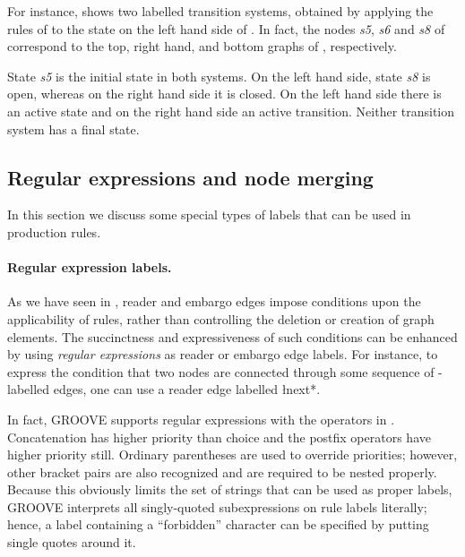 For instance,  shows two labelled transition systems, obtained by
applying the rules of  to the state on the left hand
side of . In fact, the nodes \emph{s5}, \emph{s6} and \emph{s8}
of  correspond to the top, right hand, and bottom graphs of
, respectively.

State \emph{s5} is the initial state in both systems. On the left hand side,
state \emph{s8} is open, whereas on the right hand side it is closed.  On the
left hand side there is an active state and on the right hand side an active
transition. Neither transition system has a final state.

\subsection{Regular expressions and node merging}

In this section we discuss some special types of labels that can be used in
production rules.

\paragraph{Regular expression labels.}

As we have seen in , reader and embargo edges impose
conditions upon the applicability of rules, rather than controlling the
deletion or creation of graph elements. The succinctness and expressiveness of
such conditions can be enhanced by using \emph{regular expressions} as reader
or embargo edge labels. For instance, to express the condition that two nodes
are connected through some sequence of \nextL-labelled edges, one can use a
reader edge labelled \l{next*}.

In fact, GROOVE supports regular expressions with the operators in
. Concatenation has higher priority than choice and the postfix
operators have higher priority still. Ordinary parentheses are used to override
priorities; however, other bracket pairs are also recognized and are required
to be nested properly. Because this obviously limits the set of strings that
can be used as proper labels, GROOVE interprets all singly-quoted subexpressions on
rule labels literally; hence, a label containing a ``forbidden'' character can
be specified by putting single quotes around it.

